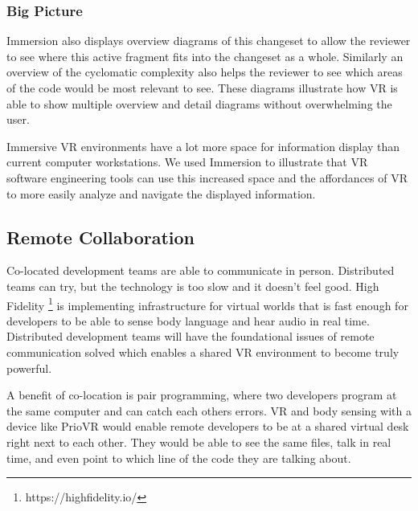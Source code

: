 \documentclass[conference]{IEEEtran}
\begin{document}
\subsubsection{Big Picture}
Immersion also displays overview diagrams of this changeset to allow the reviewer to see where this active fragment fits into the changeset as a whole. 
Similarly an overview of the cyclomatic complexity also helps the reviewer to see which areas of the code would be most relevant to see. 
These diagrams illustrate how VR is able to show multiple overview and detail diagrams without overwhelming the user.

Immersive VR environments have a lot more space for information display than current computer workstations.
We used Immersion to illustrate that VR software engineering tools can use this increased space and the affordances of VR to more easily analyze and navigate the displayed information.

\subsection{Remote Collaboration}


Co-located development teams are able to communicate in person. 
Distributed teams can try, but the technology is too slow and it doesn't feel good. 
High Fidelity \footnote{https://highfidelity.io/} is implementing infrastructure for virtual worlds that is fast enough for developers to be able to sense body language and hear audio in real time.  
Distributed development teams will have the foundational issues of remote communication solved which enables a shared VR environment to become truly powerful.

A benefit of co-location is pair programming, where two developers program at the same computer and can catch each others errors. 
VR and body sensing with a device like PrioVR would enable remote developers to be at a shared virtual desk right next to each other. 
They would be able to see the same files, talk in real time, and even point to which line of the code they are talking about. 
\end{document}
